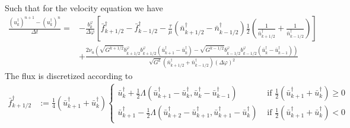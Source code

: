 Such that for the velocity equation we have
\begin{align}
    \frac{(u_k^\dagger)^{n+1}-(u_k^\dagger)^{n}}{\Delta t} = &- \frac{b^\varphi_k}{\Delta
    \varphi} \left[ \bar f^\dagger_{k+1/2} -\bar f^\dagger_{k-1/2} -
        \frac{\tau}{\mu} \left(\bar n^\dagger_{k+1/2} - \bar n^\dagger_{k-1/2}\right) \frac{1}{2}\left(\frac{1}{\bar n^\dagger_{k+1/2}}
    +\frac{1}{\bar n^\dagger_{k-1/2}}\right)\right]
    \nonumber\\
    &+ \frac{2\nu_u
        \left(\sqrt{G^{k+1/2}}b^\varphi_{k+1/2}b^\varphi_{k+1/2} (\bar u^\dagger_{k+1} - \bar u^\dagger_k)
        - \sqrt{G^{k-1/2}}b^\varphi_{k-1/2}b^\varphi_{k-1/2} (\bar u^\dagger_k - \bar u^\dagger_{k-1})\right)
    }{\sqrt{G^k}(\bar n^\dagger_{k+1/2} + \bar n^\dagger_{k-1/2}) (\Delta \varphi)^2}
\end{align}
The flux is discretized according to
\begin{align}
    \bar f^\dagger_{k+1/2} &:= \frac{1}{4}(\bar u^\dagger_{k+1}+\bar u^\dagger_k)
    \begin{cases}
        \bar u^\dagger_{k} + \frac{1}{2}\Lambda\left( \bar u^\dagger_{k+1} - \bar u^\dagger_k, \bar u^\dagger_k - \bar u^\dagger_{k-1}\right)&
        \text{ if } \frac{1}{2}(\bar u^\dagger_{k+1}+\bar u^\dagger_k) \geq 0 \\
        \bar u^\dagger_{k+1}   - \frac{1}{2}\Lambda\left( \bar u^\dagger_{k+2} - \bar u^\dagger_{k+1}, \bar u^\dagger_{k+1} -\bar u^\dagger_k \right) &
        \text{ if } \frac{1}{2}(\bar u^\dagger_{k+1}+\bar u^\dagger_k) < 0
    \end{cases}
\end{align}
